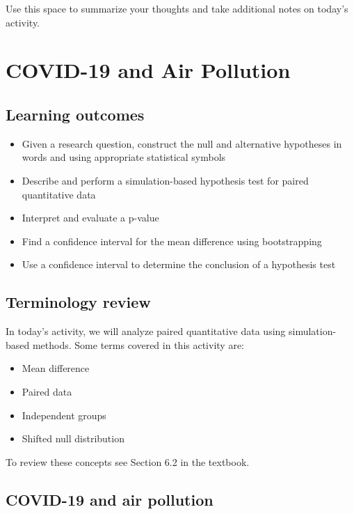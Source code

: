\documentclass[
]{report}
\begin{document}
Use this space to summarize your thoughts and take additional notes on today's activity.

\hypertarget{covid-19-and-air-pollution}{%
\chapter{COVID-19 and Air Pollution}\label{covid-19-and-air-pollution}}

\hypertarget{learning-outcomes}{%
\section{Learning outcomes}\label{learning-outcomes}}

\begin{itemize}
\item
  Given a research question, construct the null and alternative hypotheses
  in words and using appropriate statistical symbols
\item
  Describe and perform a simulation-based hypothesis test for paired quantitative data
\item
  Interpret and evaluate a p-value
\item
  Find a confidence interval for the mean difference using bootstrapping
\item
  Use a confidence interval to determine the conclusion of a hypothesis test
\end{itemize}

\hypertarget{terminology-review}{%
\section{Terminology review}\label{terminology-review}}

In today's activity, we will analyze paired quantitative data using simulation-based methods. Some terms covered in this activity are:

\begin{itemize}
\item
  Mean difference
\item
  Paired data
\item
  Independent groups
\item
  Shifted null distribution
\end{itemize}

To review these concepts see Section 6.2 in the textbook.

\hypertarget{covid-19-and-air-pollution-1}{%
\section{COVID-19 and air pollution}\label{covid-19-and-air-pollution-1}}
\end{document}
